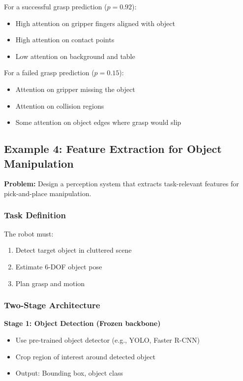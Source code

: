 For a successful grasp prediction ($p = 0.92$):
\begin{itemize}
    \item High attention on gripper fingers aligned with object
    \item High attention on contact points
    \item Low attention on background and table
\end{itemize}

For a failed grasp prediction ($p = 0.15$):
\begin{itemize}
    \item Attention on gripper missing the object
    \item Attention on collision regions
    \item Some attention on object edges where grasp would slip
\end{itemize}



\subsection{Example 4: Feature Extraction for Object Manipulation}

\textbf{Problem:} Design a perception system that extracts task-relevant features for pick-and-place manipulation.

\subsubsection{Task Definition}

The robot must:
\begin{enumerate}
    \item Detect target object in cluttered scene
    \item Estimate 6-DOF object pose
    \item Plan grasp and motion
\end{enumerate}

\subsubsection{Two-Stage Architecture}

\textbf{Stage 1: Object Detection (Frozen backbone)}
\begin{itemize}
    \item Use pre-trained object detector (e.g., YOLO, Faster R-CNN)
    \item Crop region of interest around detected object
    \item Output: Bounding box, object class
\end{itemize}

